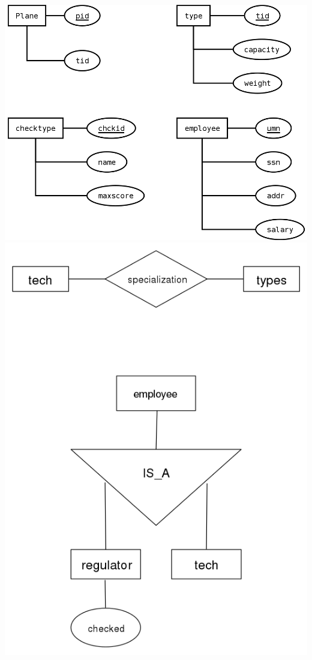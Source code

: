 \documentclass[11pt,a4paper]{article}
\begin{document}

\includegraphics[width=\textwidth]{../../ER_model/aviation_entities.png}\\
\includegraphics[width=\textwidth]{../../ER_model/aviation_relations_1.png}\\
\end{document}
